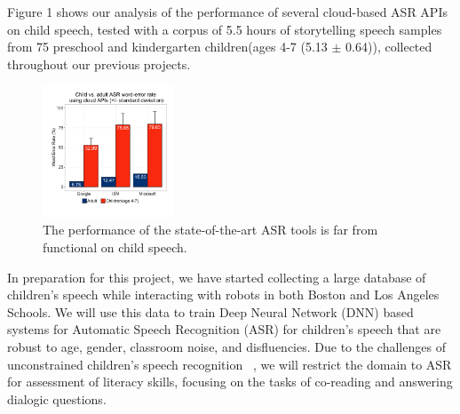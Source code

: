 Figure 1 shows our analysis of the performance of several cloud-based ASR APIs on child speech, tested with a corpus of 5.5 hours of storytelling speech samples from 75 preschool and kindergarten children(ages 4-7 (5.13 $\pm$ 0.64)), collected throughout our previous projects.

\begin{figure}
\vspace{-5mm} 
  \centering
  \includegraphics[width=0.35\textwidth]{fig/asr.pdf}  
  \caption{The performance of the state-of-the-art ASR tools is far from functional on child speech.}
  \vspace{-4mm}   
  \label{fig:jibo1}
\end{figure}


In preparation for this project, we have started collecting a large database of children's speech while interacting with robots in both Boston and Los Angeles Schools. We will use this data to train Deep Neural Network (DNN) based systems for Automatic Speech Recognition (ASR) for children's speech that are robust to age, gender, classroom noise, and disfluencies. Due to the challenges of unconstrained children's speech recognition ~\cite{fainberg2016improving}, we will restrict the domain to ASR for assessment of literacy skills, focusing on the tasks of co-reading and answering dialogic questions.


